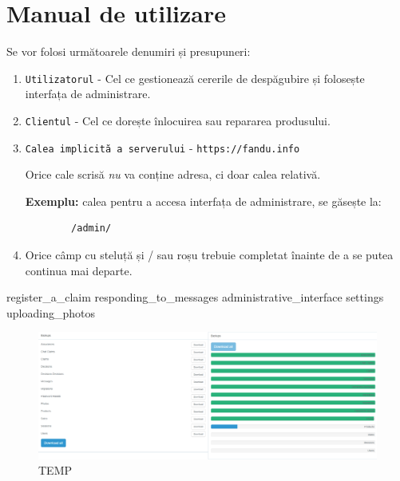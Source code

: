 \chapter{Manual de utilizare}

	Se vor folosi următoarele denumiri și presupuneri:

	\begin{enumerate}
		\item \verb|Utilizatorul| - Cel ce gestionează cererile de despăgubire și folosește interfața de administrare.
		\item \verb|Clientul| - Cel ce dorește înlocuirea sau repararea produsului.
		\item \verb|Calea implicită a serverului| - \verb|https://fandu.info|

			Orice cale scrisă \textit{nu} va conține adresa, ci doar calea relativă.

			\textbf{Exemplu:} calea pentru a accesa interfața de administrare, se găsește la:
\begin{Verbatim}
		/admin/
\end{Verbatim}
		\item Orice câmp cu steluță și / sau roșu trebuie completat înainte de a se putea continua mai departe.

	\end{enumerate}


	{register_a_claim}
	{responding_to_messages}
	{administrative_interface}
	{settings}
	{uploading_photos}



\begin{figure}
		\includegraphics[width=\linewidth]{../imagini/backups.png}
		\caption{TEMP}
		\label{fig:TEMP}
	\end{figure}

